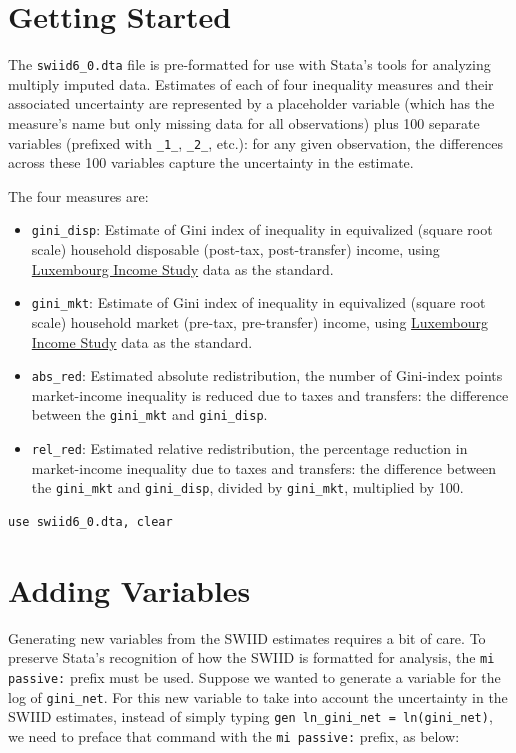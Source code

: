 \documentclass[11pt]{article}
\begin{document}
\section{Getting Started}
The \verb+swiid6_0.dta+ file is pre-formatted for use with Stata's tools for analyzing multiply imputed data.  Estimates of each of four inequality measures and their associated uncertainty are represented by a placeholder variable (which has the measure's name but only missing data for all observations) plus 100 separate variables (prefixed with \verb+_1_+, \verb+_2_+, etc.): for any given observation, the differences across these 100 variables capture the uncertainty in the estimate.   

The four measures are:
\begin{itemize}
	\item \verb+gini_disp+: Estimate of Gini index of inequality in equivalized (square root scale) household disposable (post-tax, post-transfer) income, using \href{http://www.lisdatacenter.org}{Luxembourg Income Study} data as the standard.
	\item \verb+gini_mkt+: Estimate of Gini index of inequality in equivalized (square root scale) household market (pre-tax, pre-transfer) income, using \href{http://www.lisdatacenter.org}{Luxembourg Income Study} data as the standard.	
	\item \verb+abs_red+: Estimated absolute redistribution, the number of Gini-index points market-income inequality is reduced due to taxes and transfers: the difference between the \verb+gini_mkt+ and \verb+gini_disp+.
	\item \verb+rel_red+: Estimated relative redistribution, the percentage reduction in market-income inequality due to taxes and transfers: the difference between the \verb+gini_mkt+ and \verb+gini_disp+, divided by \verb+gini_mkt+, multiplied by 100.
\end{itemize}

\begin{verbatim}
use swiid6_0.dta, clear
\end{verbatim}

\section{Adding Variables}
Generating new variables from the SWIID estimates requires a bit of care.  To preserve Stata's recognition of how the SWIID is formatted for analysis, the \verb+mi passive:+ prefix must be used.  Suppose we wanted to generate a variable for the log of \verb+gini_net+.  For this new variable to take into account the uncertainty in the SWIID estimates, instead of simply typing \verb+gen ln_gini_net = ln(gini_net)+, we need to preface that command with the \verb+mi passive:+ prefix, as below:
\end{document}
